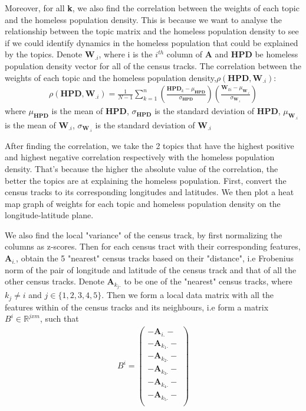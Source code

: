 \documentclass[11pt,letterpaper]{article}
\begin{document}
Moreover, for all \textbf{k}, we also find the correlation between the weights of each topic and the homeless population density. This is because we want to analyse the relationship between the topic matrix and the homeless population density to see if we could identify dynamics in the homeless population that could be explained by the topics. Denote $\textbf{W}_{.i}$, where i is the $i^{th}$ column of \textbf{A} and $\textbf{HPD}$ be homeless population density vector for all of the census tracks. The correlation between the weights of each topic and the homeless population density,$\rho(\textbf{HPD}, \textbf{W}_{.i})$:
\begin{align}
\rho(\textbf{HPD}, \textbf{W}_{.i})= \frac{1}{N-1}\sum_{k=1}^{n}\left(\frac{\textbf{HPD}_{k}-\mu_{\textbf{HPD}}}{\sigma_{\textbf{HPD}}}\right)\left(\frac{\textbf{W}_{ki}-\mu_{\textbf{W}_{.i}}}{\sigma_{\textbf{W}_{.i}}}\right)
\end{align}
where $\mu_{\textbf{HPD}}$ is the mean of $\textbf{HPD}$, $\sigma_{\textbf{HPD}}$ is the standard deviation of $\textbf{HPD}$, $\mu_{\textbf{W}_{.i}}$ is the mean of $\textbf{W}_{.i}$, $\sigma_{\textbf{W}_{.i}}$ is the standard deviation of $\textbf{W}_{.i}$
\begin{flushleft}

\end{flushleft}
After finding the correlation, we take the 2 topics that have the highest positive and highest negative correlation respectively with the homeless population density. That's because the higher the absolute value of the correlation, the better the topics are at explaining the homeless population. First, convert the census tracks to its corresponding longitudes and latitudes. We then plot a heat map graph of weights for each topic and homeless population density on the longitude-latitude plane. 

We also find the local "variance" of the census track, by first normalizing the columns as z-scores. Then for each census tract with their corresponding features, $\textbf{A}_{i.}$, obtain the 5 "nearest" census tracks based on their "distance", i.e Frobenius norm of the pair of longitude and latitude of the census track and that of all the other census tracks. Denote $\textbf{A}_{k_{j}.}$ to be one of the "nearest" census tracks, where  $k_{j} \neq i$ and $j\in\{1,2,3,4,5\}$. Then we form a local data matrix with all the features within of the census tracks and its neighbours, i.e form a matrix $B^{i}\in \mathbb{R}^{jxm}$, such that 
\begin{align}B^{i} = \begin{pmatrix} -\textbf{A}_{i.}- \\
 -\textbf{A}_{k_{1}.}-\\ 
 -\textbf{A}_{k_{2}.}-\\
 -\textbf{A}_{k_{3}.}-\\
 -\textbf{A}_{k_{4}.}-\\
 -\textbf{A}_{k_{5}.}-\\
 \end{pmatrix}
\end{align}
\end{document}

